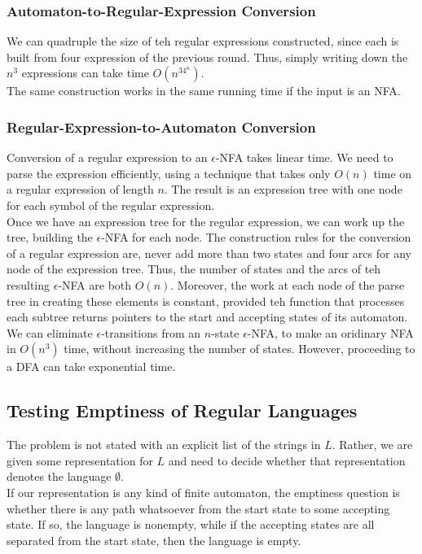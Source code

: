 \documentclass[]{article}
\begin{document}
      \subsubsection*{Automaton-to-Regular-Expression Conversion}
        We can quadruple the size of teh regular expressions constructed, since
        each is built from four expression of the previous round. Thus, simply
        writing down the $n^3$ expressions can take time $O(n^34^n)$. \\
        \indent The same construction works in the same running time if the
        input is an NFA.

      \subsubsection*{Regular-Expression-to-Automaton Conversion}
        Conversion of a regular expression to an $\epsilon$-NFA takes linear
        time. We need to parse the expression efficiently, using a technique
        that takes only $O(n)$ time on a regular expression of length $n$. The
        result is an expression tree with one node for each symbol of the
        regular expression. \\
        \indent Once we have an expression tree for the regular expression, we
        can work up the tree, building the $\epsilon$-NFA for each node. The
        construction rules for the conversion of a regular expression are, never
        add more than two states and four arcs for any node of the expression
        tree. Thus, the number of states and the arcs of teh resulting $\epsilon
        $-NFA are both $O(n)$. Moreover, the work at each node of the parse tree
        in creating these elements is constant, provided teh function that
        processes each subtree returns pointers to the start and accepting
        states of its automaton. \\
        \indent We can eliminate $\epsilon$-transitions from an $n$-state $
        \epsilon$-NFA, to make an oridinary NFA in $O(n^3)$ time, without
        increasing the number of states. However, proceeding to a DFA can take
        exponential time.

    \subsection*{Testing Emptiness of Regular Languages}
      The problem is not stated with an explicit list of the strings in $L$.
      Rather, we are given some representation for $L$ and need to decide
      whether that representation denotes the language $\emptyset$. \\
      \indent If our representation is any kind of finite automaton, the
      emptiness question is whether there is any path whatsoever from the start
      state to some accepting state. If so, the language is nonempty, while if
      the accepting states are all separated from the start state, then the
      language is empty.
\end{document}

